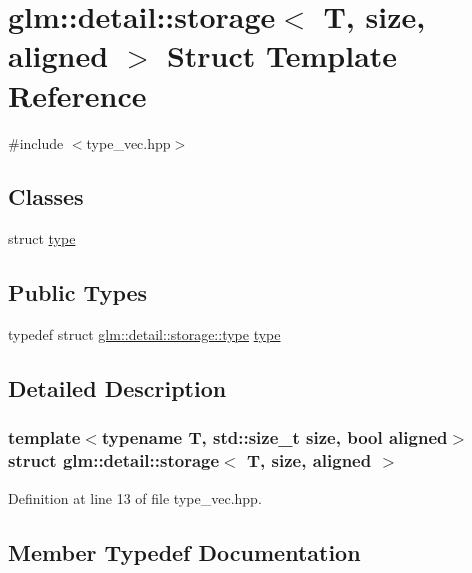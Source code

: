 \hypertarget{structglm_1_1detail_1_1storage}{}\section{glm\+::detail\+::storage$<$ T, size, aligned $>$ Struct Template Reference}
\label{structglm_1_1detail_1_1storage}


{\ttfamily \#include $<$type\+\_\+vec.\+hpp$>$}

\subsection*{Classes}
\begin{DoxyCompactItemize}
\item 
struct \mbox{\hyperlink{structglm_1_1detail_1_1storage_1_1type}{type}}
\end{DoxyCompactItemize}
\subsection*{Public Types}
\begin{DoxyCompactItemize}
\item 
typedef struct \mbox{\hyperlink{structglm_1_1detail_1_1storage_1_1type}{glm\+::detail\+::storage\+::type}} \mbox{\hyperlink{structglm_1_1detail_1_1storage_a11188a4949646a1c74aea5181fc8213d}{type}}
\end{DoxyCompactItemize}


\subsection{Detailed Description}
\subsubsection*{template$<$typename T, std\+::size\+\_\+t size, bool aligned$>$\newline
struct glm\+::detail\+::storage$<$ T, size, aligned $>$}



Definition at line 13 of file type\+\_\+vec.\+hpp.



\subsection{Member Typedef Documentation}
\mbox{\label{structglm_1_1detail_1_1storage_a11188a4949646a1c74aea5181fc8213d}} 
